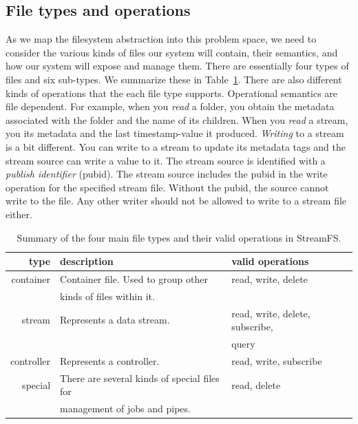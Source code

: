 \subsection{File types and operations}
As we map the filesystem abstraction into this problem space, we need to consider the various kinds of files our system will contain,
their semantics, and how our system will expose and manage them.  There are essentially four types of files and six sub-types.  We summarize
these in Table~\ref{tab:filetypes}.  There are also different kinds of operations that the each file type supports.  Operational semantics
are file dependent.  For example, when you \emph{read} a folder, you obtain the metadata associated with the folder and the name
of its children.  When you \emph{read} a stream, you its metadata and the last timestamp-value it produced.  \emph{Writing} to a stream
is a bit different.  You can write to a stream to update its metadata tags and the stream source can write a value to it.  The stream
source is identified with a \emph{publish identifier} (pubid).  The stream source includes the pubid in the write operation for 
the specified stream file.  Without the pubid, the source cannot write to the file.  Any other writer should not be allowed to write to 
a stream file either.  

\begin{table}[h]
\begin{center}
\begin{tabular}{| r | l | l |}
	\hline
	\textbf{type} & \textbf{description} & \textbf{valid operations} \\ \hline
	container & Container file.  Used to group other  & read, write, delete  \\
				   & kinds of files within it.  &  \\ \hline

	stream & Represents a data stream. & read, write, delete, subscribe, \\
			&							&query \\ \hline

	controller & Represents a controller. & read, write, subscribe \\ \hline

	special & There are several kinds of special files for  & read, delete \\
		    & management of jobs and pipes. &  \\ 
	\hline
\end{tabular}
\caption{Summary of the four main file types and their valid operations in StreamFS.}
\label{tab:filetypes}
\end{center}
\end{table}

